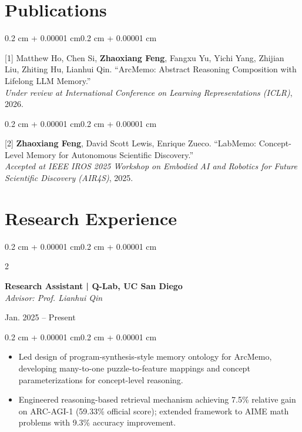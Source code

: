 \documentclass[10pt, letterpaper]{article}
\newenvironment{highlights}{
    \begin{itemize}[
        topsep=0.08 cm,
        parsep=0.08 cm,
        partopsep=0pt,
        itemsep=0pt,
        leftmargin=0.4 cm + 10pt
    ]
}{\end{itemize}}
\newenvironment{onecolentry}{
    \begin{adjustwidth}{0.2 cm + 0.00001 cm}{0.2 cm + 0.00001 cm}
}{\end{adjustwidth}}
\newenvironment{twocolentry}[2][]{
    \onecolentry
    \def\secondColumn{#2}
    \setcolumnwidth{\fill, 4.5 cm}
    \begin{paracol}{2}
}{
    \switchcolumn \raggedleft \secondColumn
    \end{paracol}
    \endonecolentry
}
\let\hrefWithoutArrow\href
\renewcommand{\href}[2]{\hrefWithoutArrow{#1}{\ifthenelse{\equal{#2}{}}{ }{#2}}}
\begin{document}
    \section{Publications}
    
    \begin{onecolentry}
        [1] Matthew Ho, Chen Si, \textbf{Zhaoxiang Feng}, Fangxu Yu, Yichi Yang, Zhijian Liu, Zhiting Hu, Lianhui Qin. ``ArcMemo: Abstract Reasoning Composition with Lifelong LLM Memory.''\\
        \textit{Under review at International Conference on Learning Representations (ICLR)}, 2026. \hfill {\color{black}\href{https://arxiv.org/abs/2509.04439}{[Paper]}} {\color{black}\href{https://github.com/matt-seb-ho/arc_memo}{[Code]}}
    \end{onecolentry}

    \vspace{0.20 cm}

    \begin{onecolentry}
        [2] \textbf{Zhaoxiang Feng}, David Scott Lewis, Enrique Zueco. ``LabMemo: Concept-Level Memory for Autonomous Scientific Discovery.''\\
        \textit{Accepted at IEEE IROS 2025 Workshop on Embodied AI and Robotics for Future Scientific Discovery (AIR4S)}, 2025. \hfill {\color{black}\href{https://github.com/aaronzhfeng/lab_memo}{[Code]}}
    \end{onecolentry}

    \section{Research Experience}

    \begin{twocolentry}{Jan. 2025 -- Present}
        \textbf{Research Assistant | Q-Lab, UC San Diego}\\
        \textit{Advisor: Prof. Lianhui Qin}
    \end{twocolentry}
    \vspace{0.08 cm}
    \begin{onecolentry}
        \begin{highlights}
            \item Led design of program-synthesis-style memory ontology for ArcMemo, developing many-to-one puzzle-to-feature mappings and concept parameterizations for concept-level reasoning.
            \item Engineered reasoning-based retrieval mechanism achieving 7.5\% relative gain on ARC-AGI-1 (59.33\% official score); extended framework to AIME math problems with 9.3\% accuracy improvement.
        \end{highlights}
    \end{onecolentry}
    \vspace{0.15 cm}
\end{document}
